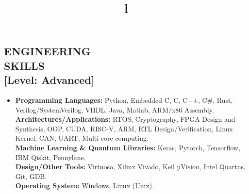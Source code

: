 \documentclass[line,margin,9pt]{res}
\begin{document}
\begin{resume}
\section{ENGINEERING\\SKILLS\\\textbf{[Level: Advanced]}}
\begin{itemize}
\item \textbf{Programming Languages:} Python, Embedded C, C, C++, C\#, Rust, Verilog/SystemVerilog, VHDL, Java, Matlab,  ARM/x86 Assembly. \\
\textbf{Architectures/Applications:} RTOS, Cryptography, FPGA Design and Synthesis, OOP, CUDA, RISC-V, ARM, RTL Design/Verification, Linux Kernel, CAN, UART, Multi-core computing. \\
\textbf{Machine Learning \& Quantum Libraries:} Keras, Pytorch, Tensorflow, IBM Qiskit, Pennylane.\\
\textbf{Design/Other Tools:} Virtuoso, Xilinx Vivado, Keil µVision, Intel Quartus, Git, GDB. \\
\textbf{Operating System:} Windows, Linux (Unix).
\end{itemize}
\begin{format}
\title{l}\\
\\
\body\\
\end{format}





\end{resume}
\end{document}
